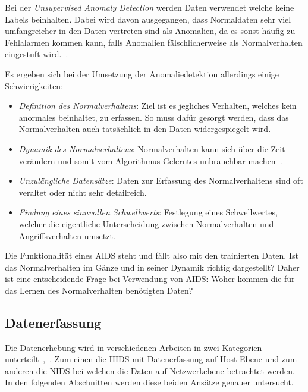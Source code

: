                 Bei der \textit{Unsupervised Anomaly Detection} werden Daten verwendet welche keine Labels beinhalten.
                Dabei wird davon ausgegangen, dass Normaldaten sehr viel umfangreicher in den Daten vertreten sind als Anomalien,
                da es sonst häufig zu Fehlalarmen kommen kann, falls Anomalien fälschlicherweise als Normalverhalten eingestuft wird.~\cite{ANOMALYSURVEY2}.

                Es ergeben sich bei der Umsetzung der Anomaliedetektion allerdings einige Schwierigkeiten:
                \begin{itemize}
                    \item \textit{Definition des Normalverhaltens}:
                        Ziel ist es jegliches Verhalten, welches kein anormales beinhaltet, zu erfassen.
                        So muss dafür gesorgt werden,
                        dass das Normalverhalten auch tatsächlich in den Daten widergespiegelt wird. 

                    \item \textit{Dynamik des Normalverhaltens}:
                        Normalverhalten kann sich über die Zeit verändern 
                        und somit vom Algorithmus Gelerntes unbrauchbar machen~\cite{ANOMALYSURVEY}.

                    \item \textit{Unzulängliche Datensätze}:
                        Daten zur Erfassung des Normalverhaltens sind oft veraltet oder nicht sehr detailreich. 

                    \item \textit{Findung eines sinnvollen Schwellwerts}:
                        Festlegung eines Schwellwertes, welcher die eigentliche Unterscheidung zwischen Normalverhalten und Angriffsverhalten umsetzt.
                \end{itemize}

                Die Funktionalität eines \ac{AIDS} steht und fällt also mit den trainierten Daten.
                Ist das Normalverhalten im Gänze und in seiner Dynamik richtig dargestellt?
                Daher ist eine entscheidende Frage bei Verwendung von \ac{AIDS}\@: Woher kommen die für das Lernen des Normalverhalten benötigten Daten?

        \subsection{Datenerfassung}\label{sec:Datenerfassung}
            Die Datenerhebung wird in verschiedenen Arbeiten in zwei Kategorien unterteilt~\cite{IDSsurvey},~\cite{IDSreview}.
            Zum einen die \ac{HIDS} mit Datenerfassung auf Host-Ebene und zum anderen die \ac{NIDS} bei welchen die Daten auf Netzwerkebene betrachtet werden.
            In den folgenden Abschnitten werden diese beiden Ansätze genauer untersucht.


